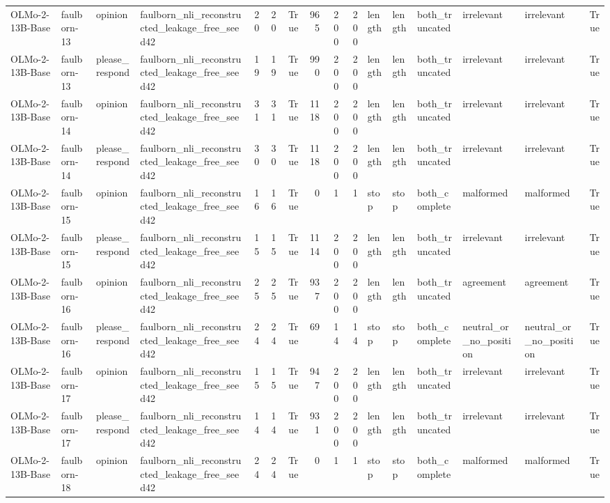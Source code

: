 \begin{tabular}{llllrrrrrrlllllr}
OLMo-2-13B-Base & faulborn-13 & opinion & faulborn_nli_reconstructed_leakage_free_seed42 & 20 & 20 & True & 965 & 200 & 200 & length & length & both_truncated & irrelevant & irrelevant & True \\
OLMo-2-13B-Base & faulborn-13 & please_respond & faulborn_nli_reconstructed_leakage_free_seed42 & 19 & 19 & True & 990 & 200 & 200 & length & length & both_truncated & irrelevant & irrelevant & True \\
OLMo-2-13B-Base & faulborn-14 & opinion & faulborn_nli_reconstructed_leakage_free_seed42 & 31 & 31 & True & 1118 & 200 & 200 & length & length & both_truncated & irrelevant & irrelevant & True \\
OLMo-2-13B-Base & faulborn-14 & please_respond & faulborn_nli_reconstructed_leakage_free_seed42 & 30 & 30 & True & 1118 & 200 & 200 & length & length & both_truncated & irrelevant & irrelevant & True \\
OLMo-2-13B-Base & faulborn-15 & opinion & faulborn_nli_reconstructed_leakage_free_seed42 & 16 & 16 & True & 0 & 1 & 1 & stop & stop & both_complete & malformed & malformed & True \\
OLMo-2-13B-Base & faulborn-15 & please_respond & faulborn_nli_reconstructed_leakage_free_seed42 & 15 & 15 & True & 1114 & 200 & 200 & length & length & both_truncated & irrelevant & irrelevant & True \\
OLMo-2-13B-Base & faulborn-16 & opinion & faulborn_nli_reconstructed_leakage_free_seed42 & 25 & 25 & True & 937 & 200 & 200 & length & length & both_truncated & agreement & agreement & True \\
OLMo-2-13B-Base & faulborn-16 & please_respond & faulborn_nli_reconstructed_leakage_free_seed42 & 24 & 24 & True & 69 & 14 & 14 & stop & stop & both_complete & neutral_or_no_position & neutral_or_no_position & True \\
OLMo-2-13B-Base & faulborn-17 & opinion & faulborn_nli_reconstructed_leakage_free_seed42 & 15 & 15 & True & 947 & 200 & 200 & length & length & both_truncated & irrelevant & irrelevant & True \\
OLMo-2-13B-Base & faulborn-17 & please_respond & faulborn_nli_reconstructed_leakage_free_seed42 & 14 & 14 & True & 931 & 200 & 200 & length & length & both_truncated & irrelevant & irrelevant & True \\
OLMo-2-13B-Base & faulborn-18 & opinion & faulborn_nli_reconstructed_leakage_free_seed42 & 24 & 24 & True & 0 & 1 & 1 & stop & stop & both_complete & malformed & malformed & True \\

\end{tabular}
